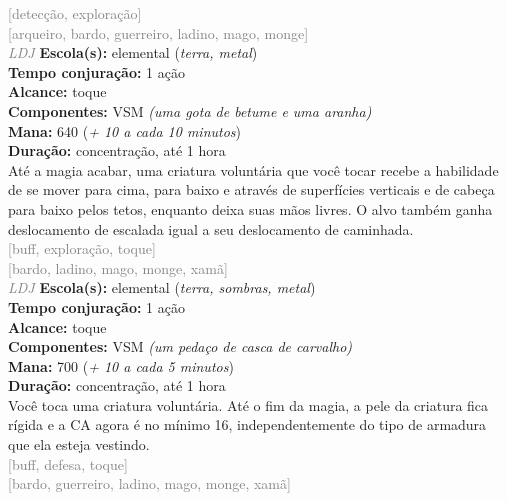 \documentclass{RPG_Adventure}[2021/10/20]
\begin{document}
{\scriptsize \textcolor{gray}{[detecção, exploração]\\}}
{\scriptsize \textcolor{gray}{[arqueiro, bardo, guerreiro, ladino, mago, monge]\\}}
{\tiny \textcolor{gray}{\textit{LDJ}}}\jump{}
{\small \t \textbf{Escola(s):} elemental (\textit{terra, metal})\\\t \textbf{Tempo conjuração:} 1 ação\\\t \textbf{Alcance:} toque\\\t \textbf{Componentes:} VSM \textit{(uma gota de betume e uma aranha)}\\\t \textbf{Mana:} 640 (\textit{+ 10 a cada 10 minutos})\\\t \textbf{Duração:} concentração, até 1 hora\\}
{\normalsize Até a magia acabar, uma criatura voluntária que você tocar recebe a habilidade de se mover para cima, para baixo e através de superfícies verticais e de cabeça para baixo pelos tetos, enquanto deixa suas mãos livres. O alvo também ganha deslocamento de escalada igual a seu deslocamento de caminhada.\\}
{\scriptsize \textcolor{gray}{[buff, exploração, toque]\\}}
{\scriptsize \textcolor{gray}{[bardo, ladino, mago, monge, xamã]\\}}
{\tiny \textcolor{gray}{\textit{LDJ}}}\jump{}
{\small \t \textbf{Escola(s):} elemental (\textit{terra, sombras, metal})\\\t \textbf{Tempo conjuração:} 1 ação\\\t \textbf{Alcance:} toque\\\t \textbf{Componentes:} VSM \textit{(um pedaço de casca de carvalho)}\\\t \textbf{Mana:} 700 (\textit{+ 10 a cada 5 minutos})\\\t \textbf{Duração:} concentração, até 1 hora\\}
{\normalsize Você toca uma criatura voluntária. Até o fim da magia, a pele da criatura fica rígida e a CA agora é no mínimo 16, independentemente do tipo de armadura que ela esteja vestindo.\\}
{\scriptsize \textcolor{gray}{[buff, defesa, toque]\\}}
{\scriptsize \textcolor{gray}{[bardo, guerreiro, ladino, mago, monge, xamã]\\}}
\end{document}
